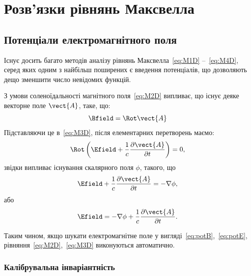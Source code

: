 
\chapter{Розв’язки рівнянь Максвелла}\label{\currfilebase}

\section{Потенціали електромагнітного поля}

Існує досить багато методів аналізу рівнянь Максвелла~\eqref{eq:M1D} --~\eqref{eq:M4D}, серед яких одним з найбільш поширених є введення потенціалів, що
дозволяють дещо
зменшити число невідомих функцій.

З умови соленоїдальності магнітного поля~\eqref{eq:M2D} випливає, що існує деяке векторне поле $\vect{A}$, таке, що:
\begin{equation}\label{eq:potB}
	 \Bfield = \Rot\vect{A}
\end{equation}
Підставляючи це в~\eqref{eq:M3D}, після елементарних перетворень маємо:
\begin{equation*}
	\Rot \left( \Efield + \frac{1}{c} \frac{\partial \vect{A}}{\partial t}\right)  = 0,
\end{equation*}
звідки випливає існування скалярного поля $\phi$, такого, що
\begin{equation*}
	\Efield  + \frac{1}{c} \frac{\partial \vect{A}}{\partial t} = - \nabla \phi,
\end{equation*}
або
\begin{equation}\label{eq:potE}
    	\Efield  = - \nabla \phi + \frac{1}{c} \frac{\partial \vect{A}}{\partial t}.
\end{equation}

Таким чином, якщо шукати електромагнітне поле у вигляді~\eqref{eq:potB},~\eqref{eq:potE}, рівняння~\eqref{eq:M2D},~\eqref{eq:M3D} виконуються
автоматично.

\subsection*{Калібрувальна інваріантність}

